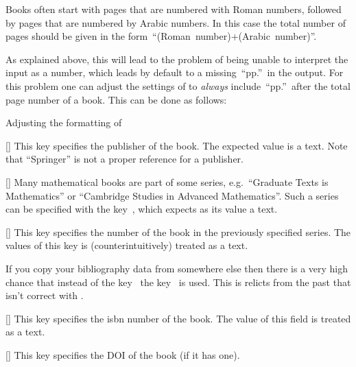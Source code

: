 \begin{description}
    Books often start with pages that are numbered with Roman numbers, followed by pages that are numbered by Arabic numbers.
    In this case the total number of pages should be given in the form~\enquote{(Roman~number)+(Arabic~number)}.

    As explained above, this will lead to the problem of  being unable to interpret the input as a number, which leads by default to a missing~\enquote{pp.}\ in the output.
    For this problem one can adjust the settings of  to \emph{always} include~\enquote{pp.}\ after the total page number of a book.
    This can be done as follows:
    \begin{showcode}{Adjusting the formatting of~}
    \end{showcode}
  \item[\optname{publisher}]
    [\optname]
    This key specifies the publisher of the book.
    The expected value is a text.
    Note that \enquote{Springer} is not a proper reference for a publisher.
  \item[\optname{series}]
    [\optname]
    Many mathematical books are part of some series, e.g.\ \enquote{Graduate Texts is Mathematics} or \enquote{Cambridge Studies in Advanced Mathematics}.
    Such a series can be specified with the key~, which expects as its value a text.
  \item[\optname{number}]
    [\optname]
    This key specifies the number of the book in the previously specified series.
    The values of this key is (counterintuitively) treated as a text.
    
    If you copy your bibliography data from somewhere else then there is a very high chance that instead of the key~ the key~ is used.
    This is relicts from the past that isn’t correct with .
  \item[\optname{isbn}]
    [\optname]
    This key specifies the isbn number of the book.
    The value of this field is treated as a text.
  \item[\optname{doi}]
    [\optname]
    This key specifies the DOI of the book (if it has one).
\end{description}

